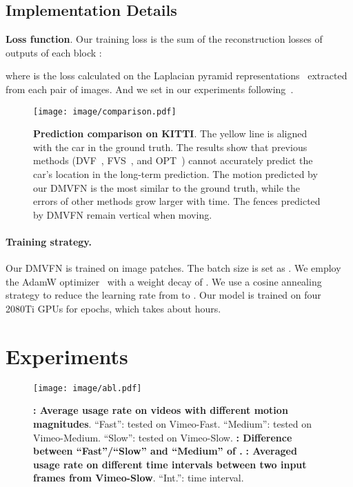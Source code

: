 \documentclass[10pt,twocolumn,letterpaper]{article}
\begin{document}
\subsection{Implementation Details}
\label{sec:implement}

\noindent
\textbf{Loss function}. Our training loss  is the sum of the reconstruction losses of outputs of each block :

where  is the  loss calculated on the Laplacian pyramid representations~\cite{laplacian} extracted from each pair of images. And we set  in our experiments following~\cite{raft}.

\begin{figure}[th]
	\centering
	\texttt{[image: image/comparison.pdf]}
	\caption{\textbf{Prediction comparison on KITTI}. The yellow line is aligned with the car in the ground truth. The results show that previous methods (DVF~\cite{dvf}, FVS~\cite{fvs}, and OPT~\cite{wu2022optimizing}) cannot accurately predict the car's location in the long-term prediction. The motion predicted by our DMVFN is the most similar to the ground truth, while the errors of other methods grow larger with time. The fences predicted by DMVFN remain vertical when moving.}
	\label{fig:kitti}
\end{figure}

\paragraph{Training strategy.} Our DMVFN is trained on  image patches. The batch size is set as . 
We employ the AdamW optimizer~\cite{adam,loshchilov2018fixing} with a weight decay of .
We use a cosine annealing strategy to reduce the learning rate from  to .
Our model is trained on four 2080Ti GPUs for  epochs, which takes about  hours.






 	\section{Experiments}


\begin{figure*}[th]
	\centering
	\texttt{[image: image/abl.pdf]}
	\caption{\textbf{: Average usage rate on videos with different motion magnitudes}. ``Fast'': tested on Vimeo-Fast. ``Medium'': tested on Vimeo-Medium. ``Slow'': tested on Vimeo-Slow.
    \textbf{: Difference between ``Fast''/``Slow'' and ``Medium'' of .}
 \textbf{: Averaged usage rate on different time intervals between two input frames from Vimeo-Slow}. ``Int.'': time interval.}
	\label{fig:ablation1}
\end{figure*}
\end{document}
